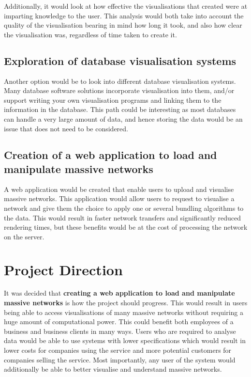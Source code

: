 \documentclass[../dissertation.tex]{subfiles}
\begin{document}
Additionally, it would look at how effective the visualisations that created were at imparting knowledge to the user. This analysis would both take into account the quality of the visualisation bearing in mind how long it took, and also how clear the visualisation was, regardless of time taken to create it. 

\subsection{Exploration of database visualisation systems}

Another option would be to look into different database visualisation systems. Many database software solutions incorporate visualisation into them, and/or support writing your own visualisation programs and linking them to the information in the database. This path could be interesting as most databases can handle a very large amount of data, and hence storing the data would be an issue that does not need to be considered. 

\subsection{Creation of a web application to load and manipulate massive networks}

A web application would be created that enable users to upload and visualise massive networks. This application would allow users to request to visualise a network and give them the choice to apply one or several bundling algorithms to the data. This would result in faster network transfers and significantly reduced rendering times, but these benefits would be at the cost of processing the network on the server.

\section{Project Direction}

It was decided that \textbf{creating a web application to load and manipulate massive networks} is how the project should progress. This would result in users being able to access visualisations of many massive networks without requiring a huge amount of computational power. This could benefit both employees of a business and business clients in many ways. Users who are required to analyse data would be able to use systems with lower specifications which would result in lower costs for companies using the service and more potential customers for companies selling the service. Most importantly, any user of the system would additionally be able to better visualise and understand massive networks.
\end{document}
